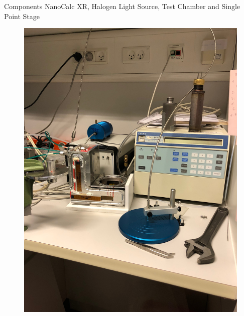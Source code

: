 \documentclass[10pt]{beamer}
\begin{document}
		\begin{frame}{Components}
		NanoCalc XR, Halogen Light Source, Test Chamber and Single Point Stage
		
		\begin{minipage}{0.47\textwidth}
		\begin{figure}
		\includegraphics[scale=0.04,angle=-90]{setup1.JPG}
		\end{figure}
		\end{minipage}
		\begin{minipage}{0.5\textwidth}
		\begin{figure}

\end{figure}
\end{minipage}
\end{frame}
\end{document}
